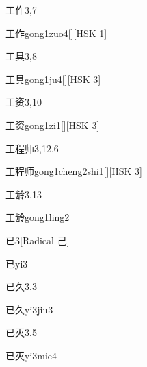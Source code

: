 \begin{entry}{工作}{3,7}
  \begin{phonetics}{工作}{gong1zuo4}[][HSK 1]
  \end{phonetics}
\end{entry}

\begin{entry}{工具}{3,8}
  \begin{phonetics}{工具}{gong1ju4}[][HSK 3]
  \end{phonetics}
\end{entry}

\begin{entry}{工资}{3,10}
  \begin{phonetics}{工资}{gong1zi1}[][HSK 3]
  \end{phonetics}
\end{entry}

\begin{entry}{工程师}{3,12,6}
  \begin{phonetics}{工程师}{gong1cheng2shi1}[][HSK 3]
  \end{phonetics}
\end{entry}

\begin{entry}{工龄}{3,13}
  \begin{phonetics}{工龄}{gong1ling2}
  \end{phonetics}
\end{entry}

\begin{entry}{已}{3}[Radical 己]
  \begin{phonetics}{已}{yi3}
  \end{phonetics}
\end{entry}

\begin{entry}{已久}{3,3}
  \begin{phonetics}{已久}{yi3jiu3}
  \end{phonetics}
\end{entry}

\begin{entry}{已灭}{3,5}
  \begin{phonetics}{已灭}{yi3mie4}
  \end{phonetics}
\end{entry}

